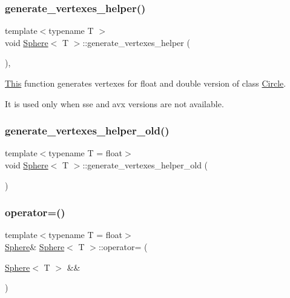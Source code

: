 \subsubsection{\texorpdfstring{generate\+\_\+vertexes\+\_\+helper()}{generate\_vertexes\_helper()}}
{\footnotesize\ttfamily template$<$typename T $>$ \\
void \mbox{\hyperlink{classSphere}{Sphere}}$<$ T $>$\+::generate\+\_\+vertexes\+\_\+helper (\begin{DoxyParamCaption}{ }\end{DoxyParamCaption})\hspace{0.3cm}{\ttfamily [inline]}, {\ttfamily [private]}}



\mbox{\hyperlink{classThis}{This}} function generates vertexes for float and double version of class \mbox{\hyperlink{classCircle}{Circle}}. 

It is used only when sse and avx versions are not available. \mbox{\label{classSphere_ab739ad1931e58a4ba7c84e3ca5c1965d}} 
\subsubsection{\texorpdfstring{generate\+\_\+vertexes\+\_\+helper\+\_\+old()}{generate\_vertexes\_helper\_old()}}
{\footnotesize\ttfamily template$<$typename T = float$>$ \\
void \mbox{\hyperlink{classSphere}{Sphere}}$<$ T $>$\+::generate\+\_\+vertexes\+\_\+helper\+\_\+old (\begin{DoxyParamCaption}{ }\end{DoxyParamCaption})\hspace{0.3cm}{\ttfamily [private]}}

\mbox{\label{classSphere_aa117f966cea7b16532cbd80c2191a84a}} 
\subsubsection{\texorpdfstring{operator=()}{operator=()}\hspace{0.1cm}{\footnotesize\ttfamily [1/2]}}
{\footnotesize\ttfamily template$<$typename T = float$>$ \\
\mbox{\hyperlink{classSphere}{Sphere}}\& \mbox{\hyperlink{classSphere}{Sphere}}$<$ T $>$\+::operator= (\begin{DoxyParamCaption}\item[{\mbox{\hyperlink{classSphere}{Sphere}}$<$ T $>$ \&\&}]{ }\end{DoxyParamCaption})\hspace{0.3cm}{\ttfamily [default]}}

